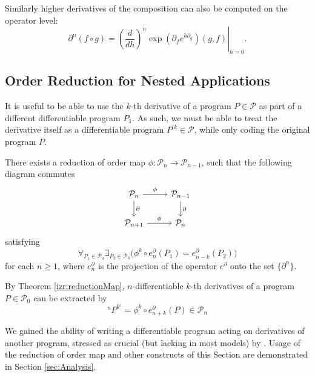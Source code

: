 \documentclass[11pt]{article}
\newcommand{\dP}{\mathcal{P}}
\newcommand{\D}{\partial}
\begin{document}
 Similarly higher derivatives of the composition can also be computed on the
 operator level:
 \begin{equation}\label{eq:dkompo}
 \D^n(f\circ g)=\left.\left(\frac{d}{dh}\right)^n\exp\left(\D_fe^{h\D_g}\right)(g,f)\right|_{h=0}.
 \end{equation}

 \subsection{Order Reduction for Nested Applications}\label{sec:orderReduction}
 
 It is useful to be able to use the $k$-th derivative of a program $P\in\dP$ as part of a different differentiable program $P_1$. As such, we must be able to treat the derivative itself as a differentiable program $P^{\prime k}\in\dP$, while only coding the original program $P$. 
\begin{theorem}\label{izr:reductionMap}
There exists a reduction of order map $\phi:\dP_n\to \dP_{n-1}$, such that the
following  diagram commutes
\begin{equation}\label{eq:reductionMap}
\begin{tikzcd}
  \dP_n \arrow{r}{\phi} \arrow{d}{\D} & 
  \dP_{n-1} \arrow{d}{\D}\\
  \dP_{n+1} \arrow{r}{\phi} & 
  \dP_{n}
\end{tikzcd}
\end{equation}
satisfying
\begin{equation*}
\forall_{P_1\in\dP_0}\exists_{P_2\in\dP_0}\Big(\phi^k\circ e^\D_n(P_1)=e^\D_{n-k}(P_2)\Big)
\end{equation*}
for each $n\ge 1$, where $e^\D_n$ is the projection of the operator $e^\D$ onto the set $\{\D^n\}$.
\end{theorem}  
\begin{corollary}\label{cor:extraxtDerivatives}
By Theorem \ref{izr:reductionMap}, $n$-differentiable $k$-th derivatives of a program $P\in\dP_0$ can be extracted by
\begin{equation*}
^{n}P^{k\prime}=\phi^k\circ e^\D_{n+k}(P)\in\dP_n
\end{equation*}
\end{corollary}    
 We gained the ability of writing a differentiable program acting on derivatives
 of another program, stressed as crucial (but lacking in most models) by
 \cite{AD1}. Usage of the reduction of order map and other constructs of
 this Section are demonstrated in Section \ref{sec:Analysis}. 
\end{document}
